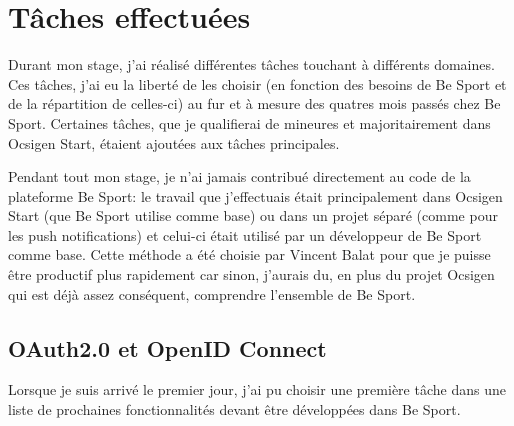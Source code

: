 \section{Tâches effectuées}

Durant mon stage, j'ai réalisé différentes tâches touchant à différents
domaines. Ces tâches, j'ai eu la liberté de les choisir (en fonction des besoins
de Be Sport et de la répartition de celles-ci) au fur et à mesure des quatres
mois passés chez Be Sport. Certaines tâches, que je qualifierai de mineures et
majoritairement dans Ocsigen Start, étaient ajoutées aux tâches principales.

Pendant tout mon stage, je n'ai jamais contribué directement au code de la
plateforme Be Sport: le travail que j'effectuais était principalement dans Ocsigen Start
(que Be Sport utilise comme base) ou dans un projet séparé (comme pour les push
notifications) et celui-ci était utilisé par un développeur de Be Sport comme
base. Cette méthode a été choisie par Vincent Balat pour que je puisse être
productif plus rapidement car sinon, j'aurais du, en plus du projet Ocsigen qui
est déjà assez conséquent, comprendre l'ensemble de Be Sport.

\subsection{OAuth2.0 et OpenID Connect}

Lorsque je suis arrivé le premier jour, j'ai pu choisir une première tâche dans
une liste de prochaines fonctionnalités devant être développées dans Be Sport.

